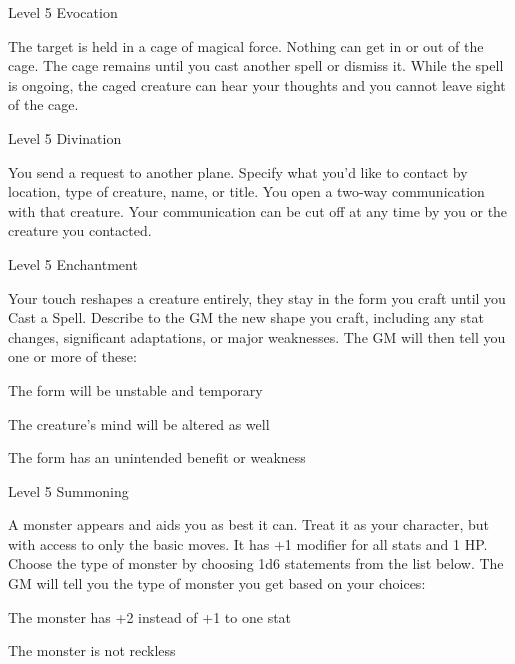 \startSpellName
          	Level 5	Evocation
\stopSpellName
       

The target is held in a cage of magical force. Nothing can get in or out of the cage. The cage remains until you cast another spell or dismiss it. While the spell is ongoing, the caged creature can hear your thoughts and you cannot leave sight of the cage.

       
\startSpellName
          	Level 5	Divination
\stopSpellName
       

You send a request to another plane. Specify what you'd like to contact by location, type of creature, name, or title. You open a two-way communication with that creature. Your communication can be cut off at any time by you or the creature you contacted.

       
\startSpellName
          	Level 5	Enchantment
\stopSpellName
       

Your touch reshapes a creature entirely, they stay in the form you craft until you Cast a Spell. Describe to the GM the new shape you craft, including any stat changes, significant adaptations, or major weaknesses. The GM will then tell you one or more of these:

       
\startitemize[1,packed]
         
\item The form will be unstable and temporary

         
\item The creature's mind will be altered as well

         
\item The form has an unintended benefit or weakness

       
\stopitemize
       
\startSpellName
          	Level 5	Summoning
\stopSpellName
       

A monster appears and aids you as best it can. Treat it as your character, but with access to only the basic moves. It has +1 modifier for all stats and 1 HP. Choose the type of monster by choosing 1d6 statements from the list below. The GM will tell you the type of monster you get based on your choices:

       
\startitemize[1,packed]
         
\item The monster has +2 instead of +1 to one stat

         
\item The monster is not reckless

